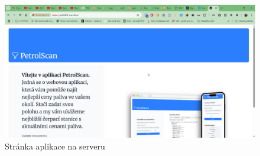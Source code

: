 \begin{figure}
    \centering
    \includegraphics[width=\linewidth]{Figures/web-server.jpg}
    \caption{Stránka aplikace na serveru}
    \label{fig:web-server}
\end{figure}

\endinput
